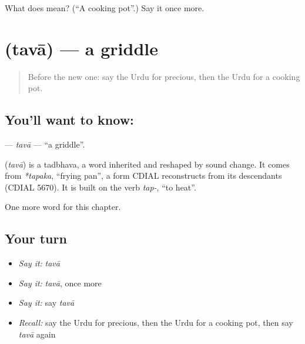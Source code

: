\begin{tcolorbox}[breakable,colback=teal!4,colframe=teal!35!black,title={Before you move on}]
What does  mean? (\textquotedblleft{}A cooking pot\textquotedblright{}.) Say it once more.
\end{tcolorbox}
\section[\texorpdfstring{\ur{توا} (tavā)}{توا (tavā)}]{ (tavā) — a griddle}

\label{lesson:UR-C250-tava}



\begin{quote}
Before the new one: say the Urdu for precious, then the Urdu for a cooking pot.
\end{quote}

\subsection*{You'll want to know: }
\textbf{} — \emph{tavā} — \textquotedblleft{}a griddle\textquotedblright{}.

\begin{cousinweb}
\textbf{} (\emph{tavā}) is a tadbhava, a word inherited and reshaped by sound change. It comes from \emph{*tapaka}, \textquotedblleft{}frying pan\textquotedblright{}, a form CDIAL reconstructs from its descendants (CDIAL 5670). It is built on the verb \emph{tap-}, \textquotedblleft{}to heat\textquotedblright{}.
\end{cousinweb}

\begin{grammarlens}[title={What you've built}]
One more word for this chapter.
\end{grammarlens}

\subsection*{Your turn}
\begin{itemize}
\raggedright
  \item \emph{Say it:} \emph{tavā}
  \item \emph{Say it:} \emph{tavā}, once more
  \item \emph{Say it:} say \emph{tavā}
  \item \emph{Recall:} say the Urdu for precious, then the Urdu for a cooking pot, then say \emph{tavā} again
\end{itemize}

